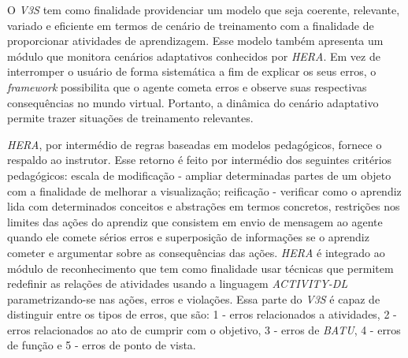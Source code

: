 O \textit{V3S} tem como finalidade providenciar um modelo que seja coerente, relevante, variado e eficiente em termos de cenário de treinamento com a finalidade de proporcionar atividades de aprendizagem. Esse modelo também apresenta um módulo que monitora cenários adaptativos conhecidos por \textit{HERA}. Em vez de interromper o usuário de forma sistemática a fim de explicar os seus erros, o \textit{framework} possibilita que o agente cometa erros e observe suas respectivas consequências no mundo virtual. Portanto, a dinâmica do cenário adaptativo permite trazer situações de treinamento relevantes. 

\textit{HERA}, por intermédio de regras baseadas em modelos pedagógicos, fornece o respaldo ao instrutor. Esse retorno é feito por intermédio dos seguintes critérios pedagógicos: escala de modificação - ampliar determinadas partes de um objeto com a finalidade de melhorar a visualização; reificação - verificar como o aprendiz lida com determinados conceitos e abstrações em termos concretos, restrições nos limites das ações do aprendiz que consistem em envio de mensagem ao agente quando ele comete sérios erros e superposição de informações se o aprendiz cometer e argumentar sobre as consequências das ações. \textit{HERA} é integrado ao módulo de reconhecimento que tem como finalidade usar técnicas que permitem redefinir as relações de atividades usando a linguagem \textit{ACTIVITY-DL} parametrizando-se nas ações, erros e violações. Essa parte do \textit{V3S} é capaz de distinguir entre os tipos de erros, que são: 1 - erros relacionados a atividades, 2 - erros relacionados ao ato de cumprir com o objetivo, 3 - erros de \textit{BATU}, 4 - erros de função e 5 - erros de ponto de vista.
